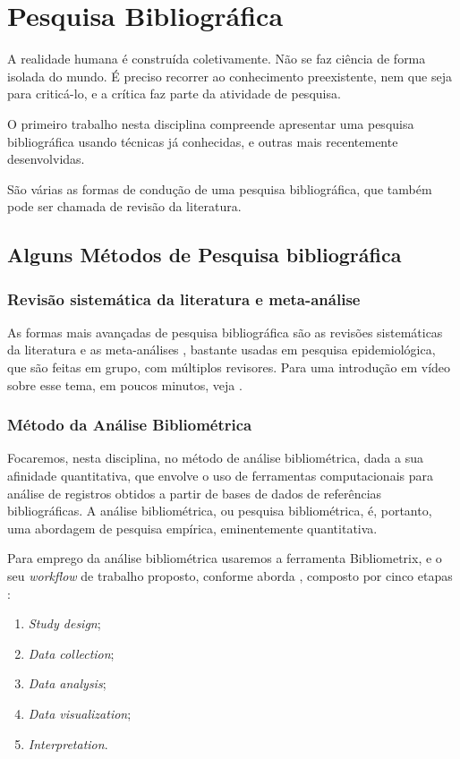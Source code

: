 \chapter{Pesquisa Bibliográfica}

A realidade humana é construída coletivamente. Não se faz ciência de forma isolada do mundo. É preciso recorrer ao conhecimento preexistente, nem que seja para criticá-lo, e a crítica faz parte da atividade de pesquisa.

O primeiro trabalho nesta disciplina compreende apresentar uma pesquisa bibliográfica usando técnicas já conhecidas, e outras mais recentemente desenvolvidas.

São várias as formas de condução de uma pesquisa bibliográfica, que também pode ser chamada de revisão da literatura.
\section{Alguns Métodos de Pesquisa bibliográfica}

\subsection{Revisão sistemática da literatura e meta-análise}

As formas mais avançadas de pesquisa bibliográfica  são as revisões sistemáticas da literatura e as meta-análises \citep{littell_systematic_2008,dresch_systematic_2015,higgins_cochrane_2011}, bastante usadas em pesquisa epidemiológica, que são feitas em grupo, com múltiplos revisores. Para uma introdução em vídeo sobre esse tema, em poucos minutos, veja \cite{testoni_revisao_2015}.

\subsection{Método da Análise Bibliométrica\label{metodo:analise:bibliografica}}

Focaremos, nesta disciplina, no método de análise bibliométrica, dada a sua afinidade quantitativa, que envolve o uso de ferramentas computacionais para análise de registros obtidos a partir de bases de dados de referências bibliográficas. A análise bibliométrica, ou pesquisa bibliométrica, é, portanto, uma abordagem de pesquisa empírica, eminentemente quantitativa.

Para emprego da análise bibliométrica usaremos a ferramenta Bibliometrix, e o seu \textit{workflow} de trabalho proposto, conforme aborda \cite{aria_bibliometrix_2017}, composto por cinco etapas \cite[p. 950]{aria_bibliometrix_2017}:
\begin{enumerate}
\item \textit{Study design};
\item \textit{Data collection};
\item \textit{Data analysis};
\item \textit{Data visualization};
\item \textit{Interpretation}.
\end{enumerate}

